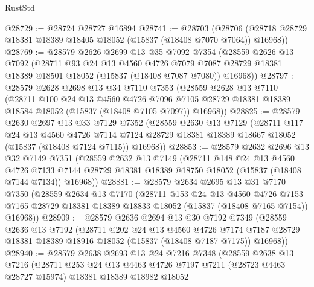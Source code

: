\begin{lexlean}{RustStd}
\begin{coremodule}
@28729 := @28724 @28727 @16894
@28741 := @28703
    (@28706 (@28718 @28729 @18381 @18389 @18405 @18052 (@15837 (@18408 @7070 @7064)) @16968))
@28769 := @28579
    @2626
    @2699
    @13
    @35
    @7092
    @7354
    (@28559
      @2626
      @13
      @7092
      (@28711
        @93
        @24
        @13
        @4560
        @4726
        @7079
        @7087
        @28729
        @18381
        @18389
        @18501
        @18052
        (@15837 (@18408 @7087 @7080))
        @16968))
@28797 := @28579
    @2628
    @2698
    @13
    @34
    @7110
    @7353
    (@28559
      @2628
      @13
      @7110
      (@28711
        @100
        @24
        @13
        @4560
        @4726
        @7096
        @7105
        @28729
        @18381
        @18389
        @18584
        @18052
        (@15837 (@18408 @7105 @7097))
        @16968))
@28825 := @28579
    @2630
    @2697
    @13
    @33
    @7129
    @7352
    (@28559
      @2630
      @13
      @7129
      (@28711
        @117
        @24
        @13
        @4560
        @4726
        @7114
        @7124
        @28729
        @18381
        @18389
        @18667
        @18052
        (@15837 (@18408 @7124 @7115))
        @16968))
@28853 := @28579
    @2632
    @2696
    @13
    @32
    @7149
    @7351
    (@28559
      @2632
      @13
      @7149
      (@28711
        @148
        @24
        @13
        @4560
        @4726
        @7133
        @7144
        @28729
        @18381
        @18389
        @18750
        @18052
        (@15837 (@18408 @7144 @7134))
        @16968))
@28881 := @28579
    @2634
    @2695
    @13
    @31
    @7170
    @7350
    (@28559
      @2634
      @13
      @7170
      (@28711
        @153
        @24
        @13
        @4560
        @4726
        @7153
        @7165
        @28729
        @18381
        @18389
        @18833
        @18052
        (@15837 (@18408 @7165 @7154))
        @16968))
@28909 := @28579
    @2636
    @2694
    @13
    @30
    @7192
    @7349
    (@28559
      @2636
      @13
      @7192
      (@28711
        @202
        @24
        @13
        @4560
        @4726
        @7174
        @7187
        @28729
        @18381
        @18389
        @18916
        @18052
        (@15837 (@18408 @7187 @7175))
        @16968))
@28940 := @28579
    @2638
    @2693
    @13
    @24
    @7216
    @7348
    (@28559
      @2638
      @13
      @7216
      (@28711
        @253
        @24
        @13
        @4463
        @4726
        @7197
        @7211
        (@28723 @4463 @28727 @15974)
        @18381
        @18389
        @18982
        @18052

\end{coremodule}
\end{lexlean}
